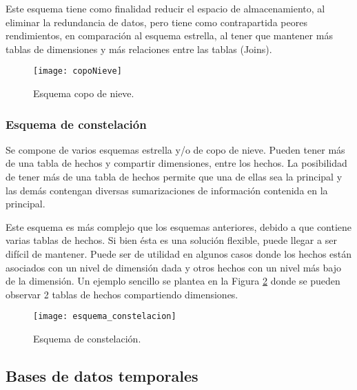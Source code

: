 \documentclass[a4paper,11pt]{article}
\begin{document}
    Este esquema tiene como finalidad reducir el espacio de almacenamiento, al eliminar la redundancia de datos, pero tiene como contrapartida
    peores rendimientos, en comparación al esquema estrella, al tener que mantener más tablas de dimensiones y más relaciones entre las tablas (Joins).
    
    \begin{figure}
      \begin{center}
        \texttt{[image: copoNieve]}
        \caption{Esquema copo de nieve. \cite{dim_models}}
        \label{snow_flk_sch}
      \end{center}
    \end{figure}
    
    
    \subsubsection{Esquema de constelación}
    
    Se compone de varios esquemas estrella y/o de copo de nieve. Pueden tener más de una tabla de hechos y compartir dimensiones, entre los hechos.
    La posibilidad de tener más de una tabla de hechos permite que una de ellas sea la principal y las demás contengan diversas sumarizaciones de información
    contenida en la principal.
    
    Este esquema es más complejo que los esquemas anteriores, debido a que contiene varias tablas de hechos. Si bien ésta es una solución flexible, puede 
    llegar a ser difícil de mantener. Puede ser de utilidad en algunos casos donde los hechos están asociados con un nivel de dimensión dada y otros hechos 
    con un nivel más bajo de la dimensión. Un ejemplo sencillo se plantea en la Figura \ref{const_sch} donde se pueden observar 2 tablas de hechos 
    compartiendo dimensiones.
    
    \begin{figure}
      \begin{center}
        \texttt{[image: esquema\_constelacion]}
        \caption{Esquema de constelación. \cite{dim_models}}
        \label{const_sch}
      \end{center}
    \end{figure}
    
    
    \subsection{Bases de datos temporales}
    
\end{document}
